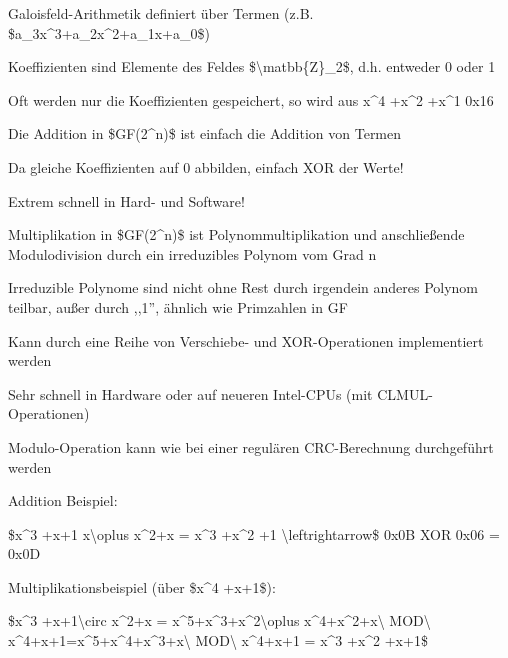 \documentclass[a4paper]{article}
\begin{document}
\begin{multicols}{3}
      \begin{itemize*}
            \item Galoisfeld-Arithmetik definiert über Termen (z.B.
            \$a\_3x\^{}3+a\_2x\^{}2+a\_1x+a\_0\$)
            \item Koeffizienten sind Elemente des Feldes
            \$\textbackslash matbb\{Z\}\_2\$, d.h. entweder 0 oder 1
            \item Oft werden nur die Koeffizienten gespeichert, so wird aus x\^{}4
            +x\^{}2 +x\^{}1 0x16
            \item Die Addition in \$GF(2\^{}n)\$ ist einfach die Addition von Termen
            \begin{itemize*}
                  \item Da gleiche Koeffizienten auf 0 abbilden, einfach XOR der Werte!
                  \item Extrem schnell in Hard- und Software!
            \end{itemize*}
            \item Multiplikation in \$GF(2\^{}n)\$ ist Polynommultiplikation und
            anschließende Modulodivision durch ein irreduzibles Polynom vom Grad n
            \begin{itemize*}
                  \item Irreduzible Polynome sind nicht ohne Rest durch irgendein anderes Polynom teilbar, außer durch ,,1'', ähnlich wie Primzahlen in GF
                  \item Kann durch eine Reihe von Verschiebe- und XOR-Operationen implementiert werden
                  \item Sehr schnell in Hardware oder auf neueren Intel-CPUs (mit CLMUL-Operationen)
                  \item Modulo-Operation kann wie bei einer regulären CRC-Berechnung durchgeführt werden
            \end{itemize*}
            \item Addition Beispiel:
            \begin{itemize*}
                  \item \$x\^{}3 +x+1 x\textbackslash oplus x\^{}2+x = x\^{}3 +x\^{}2 +1 \textbackslash leftrightarrow\$ 0x0B XOR 0x06 = 0x0D
            \end{itemize*}
            \item Multiplikationsbeispiel (über \$x\^{}4 +x+1\$):
            \begin{itemize*}
                  \item \$x\^{}3 +x+1\textbackslash circ x\^{}2+x = x\^{}5+x\^{}3+x\^{}2\textbackslash oplus x\^{}4+x\^{}2+x\textbackslash{} MOD\textbackslash{} x\^{}4+x+1=x\^{}5+x\^{}4+x\^{}3+x\textbackslash{} MOD\textbackslash{} x\^{}4+x+1 = x\^{}3 +x\^{}2 +x+1\$

\end{itemize*}
\end{itemize*}
\end{multicols}
\end{document}
